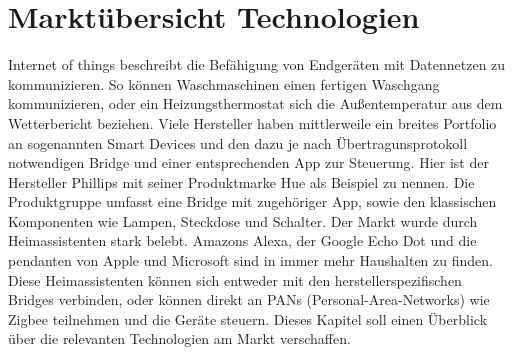 \chapter{Marktübersicht Technologien}

\grqq Internet of things\grqq{} beschreibt die Befähigung von Endgeräten mit Datennetzen zu kommunizieren. So können Waschmaschinen einen fertigen Waschgang kommunizieren,
oder ein Heizungsthermostat sich die Außentemperatur aus dem Wetterbericht beziehen. Viele Hersteller haben mittlerweile ein breites Portfolio an sogenannten \grqq Smart Devices \grqq{} und den dazu
je nach Übertragunsprotokoll notwendigen \grqq Bridge\grqq{} und einer entsprechenden App zur Steuerung. Hier ist der Hersteller Phillips mit seiner Produktmarke \grqq Hue\grqq{}
als Beispiel zu nennen. Die Produktgruppe umfasst eine Bridge mit zugehöriger App, sowie den klassischen Komponenten wie Lampen, Steckdose und Schalter.
Der Markt wurde durch Heimassistenten stark belebt. Amazons Alexa, der Google Echo Dot und die pendanten von Apple und Microsoft sind in immer mehr Haushalten zu finden.
Diese Heimassistenten können sich entweder mit den herstellerspezifischen Bridges verbinden, oder können direkt an PANs (Personal-Area-Networks) wie Zigbee
teilnehmen und die Geräte steuern. Dieses Kapitel soll einen Überblick über die relevanten Technologien am Markt verschaffen. 


